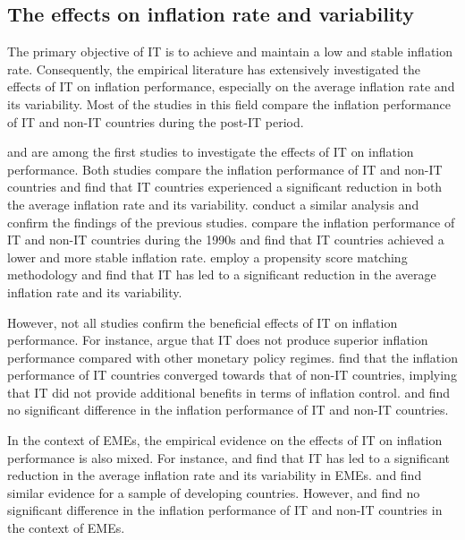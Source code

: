 \documentclass{article}
\begin{document}
\subsection{The effects on inflation rate and variability}

The primary objective of IT is to achieve and maintain a low and stable inflation rate. Consequently, the empirical literature has extensively investigated the effects of IT on inflation performance, especially on the average inflation rate and its variability. Most of the studies in this field compare the inflation performance of IT and non-IT countries during the post-IT period.

\citet{bernanke1997inflation} and \citet{mishkin2000} are among the first studies to investigate the effects of IT on inflation performance. Both studies compare the inflation performance of IT and non-IT countries and find that IT countries experienced a significant reduction in both the average inflation rate and its variability. \citet{corbo2001} conduct a similar analysis and confirm the findings of the previous studies. \citet{neumann2002} compare the inflation performance of IT and non-IT countries during the 1990s and find that IT countries achieved a lower and more stable inflation rate. \citet{vega2005} employ a propensity score matching methodology and find that IT has led to a significant reduction in the average inflation rate and its variability.

However, not all studies confirm the beneficial effects of IT on inflation performance. For instance, \citet{ball1999a} argue that IT does not produce superior inflation performance compared with other monetary policy regimes. \citet{walsh2009} find that the inflation performance of IT countries converged towards that of non-IT countries, implying that IT did not provide additional benefits in terms of inflation control. \citet{goncalves2009} and \citet{lin2010} find no significant difference in the inflation performance of IT and non-IT countries.

In the context of EMEs, the empirical evidence on the effects of IT on inflation performance is also mixed. For instance, \citet{mishkin2000} and \citet{mishkin2002} find that IT has led to a significant reduction in the average inflation rate and its variability in EMEs. \citet{fry-mckibbin2014} and \citet{thornton2017} find similar evidence for a sample of developing countries. However, \citet{lin2010} and \citet{lin2009} find no significant difference in the inflation performance of IT and non-IT countries in the context of EMEs.
\end{document}
